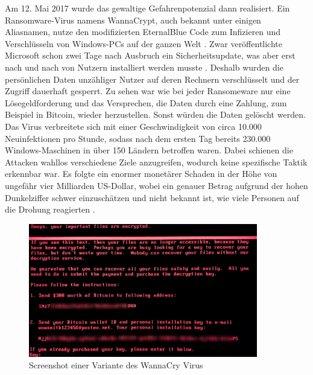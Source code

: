 \documentclass[DIV=12,headings=normal,pdftex,headinclude=false,footinclude=false,final]{scrreprt}
\begin{document}
\noindent
Am 12. Mai 2017 wurde das gewaltige Gefahrenpotenzial dann realisiert. Ein Ransomware-Virus namens WannaCrypt, auch bekannt unter einigen Aliasnamen, nutze den modifizierten EternalBlue Code zum Infizieren und Verschlüsseln von Windows-PCs auf der ganzen Welt \cite{Avast}. Zwar veröffentlichte Microsoft schon zwei Tage nach Ausbruch ein Sicherheitsupdate, was aber erst nach und nach von Nutzern installiert werden musste \cite{MSSB}. Deshalb wurden die persönlichen Daten unzähliger Nutzer auf deren Rechnern verschlüsselt und der Zugriff dauerhaft gesperrt. Zu sehen war wie bei jeder Ransomeware nur eine Lösegeldforderung und das Versprechen, die Daten durch eine Zahlung, zum Beispiel in Bitcoin, wieder herzustellen. Sonst würden die Daten gelöscht werden. Das Virus verbreitete sich mit einer Geschwindigkeit von circa 10.000 Neuinfektionen pro Stunde, sodass nach dem ersten Tag bereits 230.000 Windows-Maschinen in über 150 Ländern betroffen waren. Dabei schienen die Attacken wahllos verschiedene Ziele anzugreifen, wodurch keine spezifische Taktik erkennbar war. Es folgte ein enormer monetärer Schaden in der Höhe von ungefähr vier Milliarden US-Dollar, wobei ein genauer Betrag aufgrund der hohen Dunkelziffer schwer einzuschätzen und nicht bekannt ist, wie viele Personen auf die Drohung reagierten \cite{Avast}.

\begin{figure}[H]
    \centering
    \includegraphics[width=10cm]{notpetya_ransomware.jpg}
    \caption[NotPetya Screenshot, Nutzer ''GrEat''/Kaspersky, URL: \url{https://media.kasperskydaily.com/wp-content/uploads/sites/92/2017/06/27133735/wannamore-ransomware-screenshot.jpg}]{Screenshot einer Variante des WannaCry Virus}
    \label{img:not_petya}
\end{figure}
\end{document}
